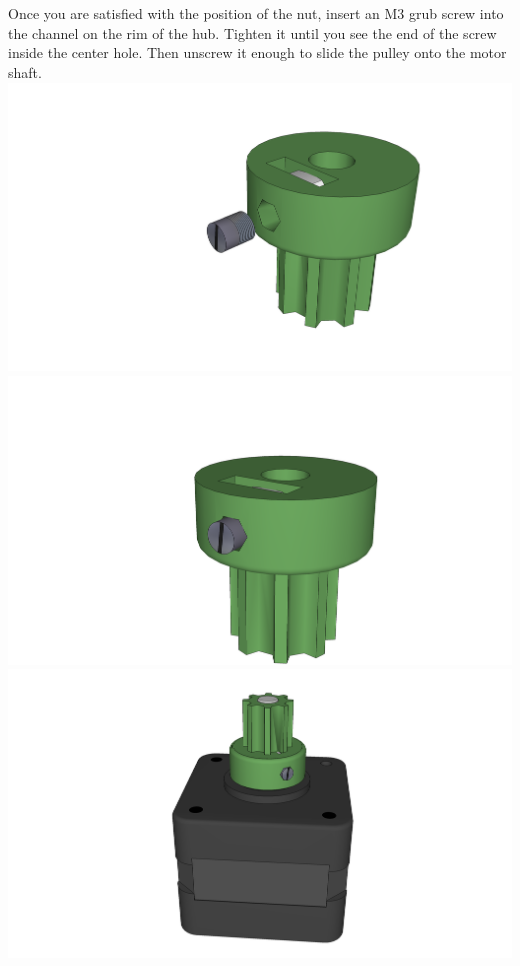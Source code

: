 \documentclass[twoside,a4paper,titlepage]{memoir}
\begin{document}
	\section{}
	Once you are satisfied with the position of the nut, insert an M3 grub screw into the channel on the rim
	of the hub. Tighten it until you see the end of the screw inside the center hole. Then unscrew it enough
	to slide the pulley onto the motor shaft.\\
	\includegraphics[width=1\linewidth]{graphics/ch6_15_1.png}
	\includegraphics[width=1\linewidth]{graphics/ch6_15_2.png}
	\includegraphics[width=1\linewidth]{graphics/ch6_15_3.png}
	
\end{document}
